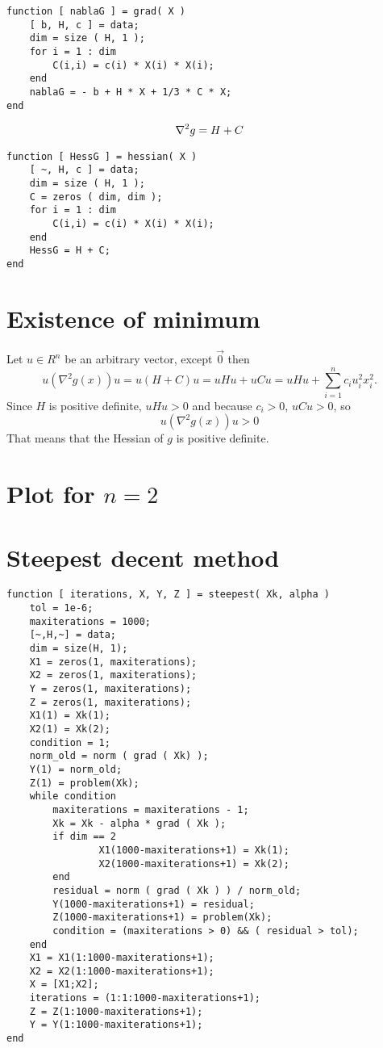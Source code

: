 \documentclass[a4paper,12pt]{article}
\begin{document}
\begin{lstlisting}
function [ nablaG ] = grad( X )
	[ b, H, c ] = data;
	dim = size ( H, 1 );
	for i = 1 : dim
	    C(i,i) = c(i) * X(i) * X(i);
	end
	nablaG = - b + H * X + 1/3 * C * X;
end
\end{lstlisting}

\begin{align}\label{hess}
{\bf\nabla}^2 g =  H + C
\end{align}

\begin{lstlisting}
function [ HessG ] = hessian( X )
	[ ~, H, c ] = data;
	dim = size ( H, 1 );
	C = zeros ( dim, dim );
	for i = 1 : dim
		C(i,i) = c(i) * X(i) * X(i);
	end
	HessG = H + C;
end
\end{lstlisting}


\section{Existence of minimum}
Let $u\in R^n$ be an arbitrary vector, except $\vec{0}$ then
$$u(\nabla^2g(x))u = u (H+C) u = u H u + uCu = uHu + \sum_{i=1}^n c_iu_i^2x_i^2.$$
Since $H$ is positive definite, $uHu>0$ and because $c_i>0$, $uCu>0$, so 
$$u(\nabla^2g(x))u>0$$ 
That means that the Hessian of $g$ is positive definite.
\section{Plot for $n=2$}

\section{Steepest decent method}
\begin{lstlisting}
function [ iterations, X, Y, Z ] = steepest( Xk, alpha )
	tol = 1e-6;
	maxiterations = 1000;
	[~,H,~] = data;
	dim = size(H, 1);
	X1 = zeros(1, maxiterations);
	X2 = zeros(1, maxiterations);
	Y = zeros(1, maxiterations);
	Z = zeros(1, maxiterations);
	X1(1) = Xk(1);
	X2(1) = Xk(2);
	condition = 1;
	norm_old = norm ( grad ( Xk) );
	Y(1) = norm_old;
	Z(1) = problem(Xk);
	while condition
		maxiterations = maxiterations - 1;
		Xk = Xk - alpha * grad ( Xk );
		if dim == 2
				X1(1000-maxiterations+1) = Xk(1);
				X2(1000-maxiterations+1) = Xk(2);
		end
		residual = norm ( grad ( Xk ) ) / norm_old;
		Y(1000-maxiterations+1) = residual;
		Z(1000-maxiterations+1) = problem(Xk);
		condition = (maxiterations > 0) && ( residual > tol);
	end
	X1 = X1(1:1000-maxiterations+1);
	X2 = X2(1:1000-maxiterations+1);
	X = [X1;X2];
	iterations = (1:1:1000-maxiterations+1);
	Z = Z(1:1000-maxiterations+1);
	Y = Y(1:1000-maxiterations+1);
end
\end{lstlisting}
\end{document}
